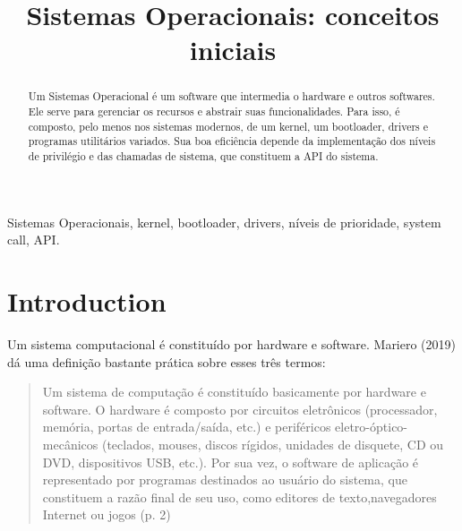 \documentclass[conference]{IEEEtran}
\begin{document}
\title{Sistemas Operacionais: conceitos iniciais}

\author{
\and
}

\maketitle

\begin{abstract}
Um Sistemas Operacional é um software que intermedia o hardware e outros softwares. Ele serve para gerenciar os recursos e abstrair suas funcionalidades. Para isso, é composto, pelo menos nos sistemas modernos, de um kernel, um bootloader, drivers e programas utilitários variados. Sua boa eficiência depende da implementação dos níveis de privilégio e das chamadas de sistema, que constituem a API do sistema.
\end{abstract}

\begin{IEEEkeywords}
Sistemas Operacionais, kernel, bootloader, drivers, níveis de prioridade, system call, API.
\end{IEEEkeywords}

\section{Introduction}
Um sistema computacional é constituído por hardware e software. Mariero (2019) dá uma definição bastante prática sobre esses três termos:

\begin{quote}
    Um sistema de computação é constituído basicamente por hardware e software. O hardware é composto por circuitos eletrônicos (processador, memória, portas de entrada/saída, etc.) e periféricos eletro-óptico-mecânicos (teclados, mouses, discos rígidos, unidades de disquete, CD ou DVD, dispositivos USB, etc.). Por sua vez, o software de aplicação é representado por programas destinados ao usuário do sistema, que constituem a razão final de seu uso, como editores de texto,navegadores Internet ou jogos (p. 2)

\end{quote}
\end{document}
